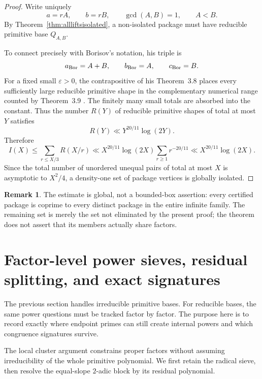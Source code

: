 \documentclass[11pt]{article}
\theoremstyle{definition}
\newtheorem{remark}[theorem]{Remark}
\begin{document}
\begin{proof}
Write uniquely
\[
 a=rA,\qquad b=rB,
 \qquad\gcd(A,B)=1,
 \qquad A<B.
\]
By Theorem~\ref{thm:allliftsisolated}, a non-isolated package must have
reducible primitive base \(Q_{A,B}\).

To connect precisely with Borisov's notation, his triple is
\[
 a_{\rm Bor}=A+B,
 \qquad b_{\rm Bor}=A,
 \qquad c_{\rm Bor}=B.
\]
For a fixed small \(\varepsilon>0\), the contrapositive of his
Theorem~3.8 places every sufficiently large reducible primitive shape in the
complementary numerical range counted by Theorem~3.9 \cite{Borisov1998}.  The finitely many
small totals are absorbed into the constant.  Thus the number \(R(Y)\) of
reducible primitive shapes of total at most \(Y\) satisfies
\begin{equation}
 R(Y)\ll Y^{20/11}\log(2Y).
 \tag{14.11}
\end{equation}
Therefore
\[
 I(X)\leq\sum_{r\leq X/3}R(X/r)
 \ll X^{20/11}\log(2X)
 \sum_{r\geq1}r^{-20/11}
 \ll X^{20/11}\log(2X).
\]
Since the total number of unordered unequal pairs of total at most \(X\) is
asymptotic to \(X^2/4\), a density-one set of package vertices is globally
isolated.
\end{proof}

\begin{remark}
The estimate is global, not a bounded-box assertion: every certified package
is coprime to every distinct package in the entire infinite family.  The
remaining set is merely the set not eliminated by the present proof; the
theorem does not assert that its members actually share factors.
\end{remark}

\section{Factor-level power sieves, residual splitting, and exact signatures}

The previous section handles irreducible primitive bases.  For reducible bases, the same power questions must be tracked factor by factor.  The purpose here is to record exactly where endpoint primes can still create internal powers and which congruence signatures survive.
\label{sec:degreesieve}

The local cluster argument constrains proper factors without assuming
irreducibility of the whole primitive polynomial.  We first retain the
radical sieve, then resolve the equal-slope \(2\)-adic block by its residual
polynomial.
\end{document}
